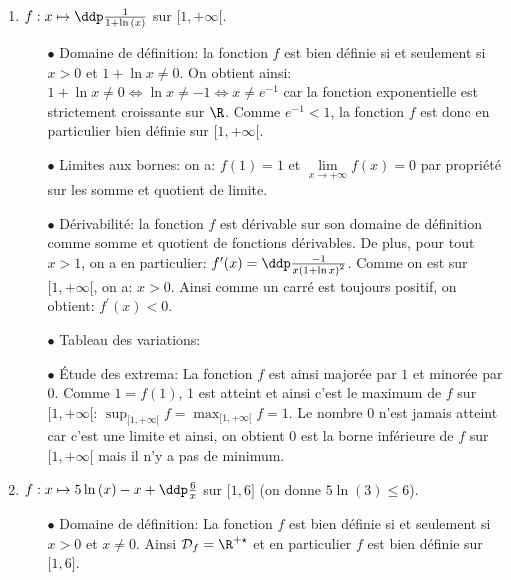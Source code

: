 \begin{correction}
\begin{enumerate}
\begin{itemize}
\end{itemize}
\item $f: x\mapsto \ddp\frac{1}{1+\ln{(x)}}$ sur $\lbrack 1,+\infty\lbrack$. 
\begin{itemize}
\item[$\bullet$] Domaine de d\'efinition: la fonction $f$ est bien d\'efinie si et seulement si $x>0$ et $1+\ln{x}\not= 0$. On obtient ainsi: $1+\ln{x}\not= 0\Leftrightarrow \ln{x}\not= -1\Leftrightarrow x\not= e^{-1}$ car la fonction exponentielle est strictement croissante sur $\R$. Comme $e^{-1}<1$, la fonction $f$ est donc en particulier bien d\'efinie sur $\lbrack 1,+\infty\lbrack$.
\item[$\bullet$] Limites aux bornes: on a: $f(1)=1$ et $\lim\limits_{x\to +\infty} f(x)=0$ par propri\'et\'e sur les somme et quotient de limite.
\item[$\bullet$] D\'erivabilit\'e: la fonction $f$ est d\'erivable sur son domaine de d\'efinition comme somme et quotient de fonctions d\'erivables. De plus, pour tout $x>1$, on a en particulier: $f^{\prime}(x)=\ddp\frac{-1}{x\left( 1+\ln{x} \right)^2}$. Comme on est sur $\lbrack 1,+\infty\lbrack$, on a: $x>0$. Ainsi comme un carr\'e est toujours positif, on obtient: $f^{\prime}(x)<0$.
\item[$\bullet$] Tableau des variations:
\begin{center}
\end{center}
\item[$\bullet$] \'Etude des extrema: La fonction $f$ est ainsi major\'ee par $1$ et minor\'ee par $0$. Comme $1=f(1)$, $1$ est atteint et ainsi c'est le maximum de $f$ sur $\lbrack 1,+\infty\lbrack$: $\sup_{\lbrack 1,+\infty\lbrack } f=\max_{\lbrack 1,+\infty\lbrack} f=1$. Le nombre 0 n'est jamais atteint car c'est une limite et ainsi, on obtient $0$ est la borne inf\'erieure de $f$ sur $\lbrack 1,+\infty\lbrack$ mais il n'y a pas de minimum.
\end{itemize}
\item $f: x\mapsto 5\ln{(x)}-x+\ddp\frac{6}{x}$ sur $\lbrack 1,6\rbrack$ (on donne $5\ln{(3)}\leq 6$).
\begin{itemize}
\item[$\bullet$] Domaine de d\'efinition: La fonction $f$ est bien d\'efinie si et seulement si $x>0$ et $x\not= 0$. Ainsi $\mathcal{D}_f=\R^{+\star}$ et en particulier $f$ est bien d\'efinie sur $\lbrack 1,6\rbrack$.

\end{itemize}
\end{enumerate}
\end{correction}
